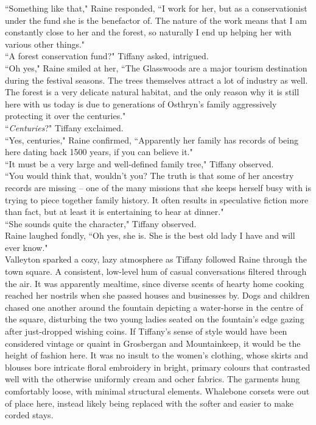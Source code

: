 ``Something like that," Raine responded, ``I work for her, but as a conservationist under the fund she is the benefactor of. The nature of the work means that I am constantly close to her and the forest, so naturally I end up helping her with various other things."\\
``A forest conservation fund?" Tiffany asked, intrigued.\\
``Oh yes," Raine smiled at her, ``The Glasswoods are a major tourism destination during the festival seasons. The trees themselves attract a lot of industry as well. The forest is a very delicate natural habitat, and the only reason why it is still here with us today is due to generations of Osthryn's family aggressively protecting it over the centuries."\\
``\textit{Centuries}?" Tiffany exclaimed.\\
``Yes, centuries," Raine confirmed, ``Apparently her family has records of being here dating back 1500 years, if you can believe it."\\
``It must be a very large and well-defined family tree," Tiffany observed.\\
``You would think that, wouldn't you? The truth is that some of her ancestry records are missing -- one of the many missions that she keeps herself busy with is trying to piece together family history. It often results in speculative fiction more than fact, but at least it is entertaining to hear at dinner."\\
``She sounds quite the character," Tiffany observed.\\
Raine laughed fondly, ``Oh yes, she is. She is the best old lady I have and will ever know."\\

Valleyton sparked a cozy, lazy atmosphere as Tiffany followed Raine through the town square.
A consistent, low-level hum of casual conversations filtered through the air. 
It was apparently mealtime, since diverse scents of hearty home cooking reached her nostrils when she passed houses and businesses by.
Dogs and children chased one another around the fountain depicting a water-horse in the centre of the square, disturbing the two young ladies seated on the fountain's edge gazing after just-dropped wishing coins.
If Tiffany's sense of style would have been considered vintage or quaint in Grosbergan and Mountainkeep, it would be the height of fashion here.
It was no insult to the women's clothing, whose skirts and blouses bore intricate floral embroidery in bright, primary colours that contrasted well with the otherwise uniformly cream and ocher fabrics.
The garments hung comfortably loose, with minimal structural elements. 
Whalebone corsets were out of place here, instead likely being replaced with the softer and easier to make corded stays.\\

